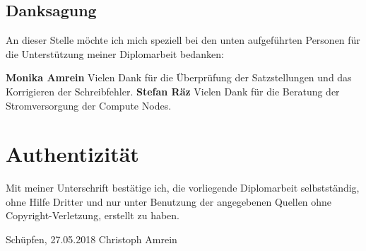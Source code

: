 \subsection{Danksagung}
An dieser Stelle möchte ich mich speziell bei den unten aufgeführten Personen für die Unterstützung meiner Diplomarbeit bedanken:

\textbf{Monika Amrein}\newline
Vielen Dank für die Überprüfung der Satzstellungen und das Korrigieren der Schreibfehler.\newline
\textbf{Stefan Räz}\newline
Vielen Dank für die Beratung der Stromversorgung der Compute Nodes.

\newpage
\section{Authentizität}
Mit meiner Unterschrift bestätige ich, die vorliegende Diplomarbeit selbstständig, ohne Hilfe Dritter und nur unter Benutzung der angegebenen Quellen ohne Copyright-Verletzung, erstellt zu haben.

Schüpfen, 27.05.2018\newline
\newline
\newline
Christoph Amrein

